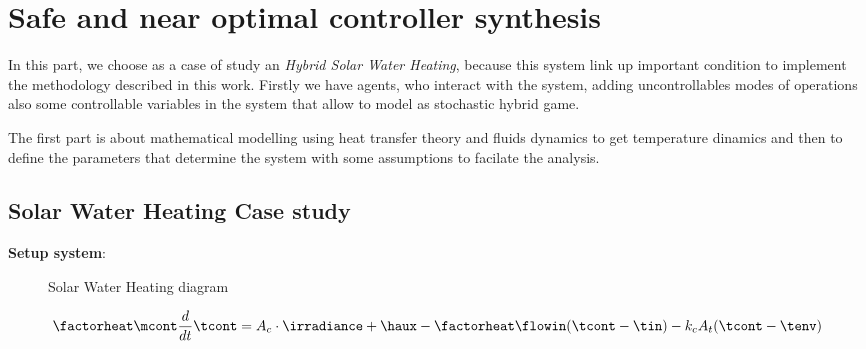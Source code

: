 
\chapter{Safe and near optimal controller synthesis}

\label{ch:proposal}
In this part, we choose as a case of study an \emph{Hybrid Solar Water
Heating}, because this system link up important condition to implement the
methodology described in this work. Firstly we have agents, who interact with 
the system, adding uncontrollables modes of operations also some controllable
variables in the system that allow to model as stochastic hybrid game.

The first part is about mathematical modelling using heat transfer
theory and fluids dynamics to get temperature dinamics and then 
to define the parameters that determine the system with some
assumptions to facilate the analysis.

\clearpage
\section{Solar Water Heating Case study}

\textbf{Setup system}:

\begin{figure}[!hbt]

\caption{Solar Water Heating diagram}
\end{figure}

\begin{equation}
    \factorheat\mcont\frac{d}{dt}\tcont =  A_c\cdot\irradiance + \haux - \factorheat \flowin (\tcont-\tin) -   k_c A_t (\tcont-\tenv)
\end{equation}






